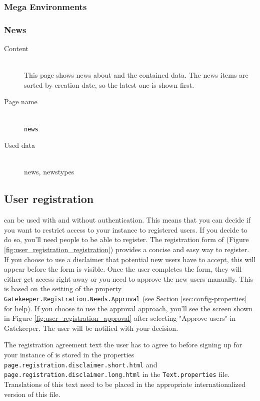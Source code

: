 \subsubsection{Mega Environments}

\subsubsection{News}
\begin{description}
	\item[Content]\hfill\\This page shows news about {\germinate} and the contained data. The news items are sorted by creation date, so the latest one is shown first.
	\item[Page name]\hfill\\\texttt{news}
	\item[Used data]\hfill\\news, newstypes
\end{description}


\subsection{User registration}
\label{sec:registration}

{\germinate} can be used with and without authentication. This means that you can decide if you want to restrict access to your {\germinate} instance to registered users. If you decide to do so, you'll need people to be able to register. The registration form of {\germinate} (Figure \ref{fig:user_registration_registration}) provides a concise and easy way to register. If you choose to use a disclaimer that potential new users have to accept, this will appear before the form is visible. Once the user completes the form, they will either get access right away or you need to approve the new users manually. This is based on the setting of the property \texttt{Gatekeeper.Registration.Needs.Approval} (see Section \ref{sec:config-properties} for help). If you choose to use the approval approach, you'll see the screen shown in Figure \ref{fig:user_registration_approval} after selecting "Approve users" in Gatekeeper. The user will be notified with your decision.

The registration agreement text the user has to agree to before signing up for your instance of {\germinate} is stored in the properties \texttt{page.\allowbreak registration.\allowbreak disclaimer.\allowbreak short.\allowbreak html} and \texttt{page.\allowbreak registration.\allowbreak disclaimer.\allowbreak long.\allowbreak html} in the \texttt{Text.properties} file. Translations of this text need to be placed in the appropriate internationalized version of this file.


